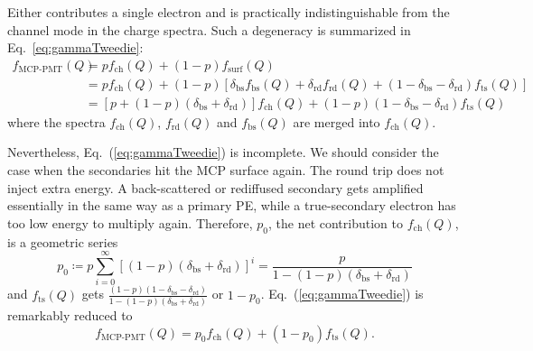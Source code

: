 Either contributes a single electron and is practically indistinguishable from
the channel mode in the charge spectra. Such a degeneracy is summarized in Eq.~\eqref{eq:gammaTweedie}:
\begin{equation}
	\label{eq:gammaTweedie}
	\begin{aligned}
		f_{\text{MCP-PMT}}(Q) & = p f_{\mathrm{ch}}(Q) + (1-p) f_{\mathrm{surf}}(Q)                                                                                                                                    \\
		                      & = p f_{\mathrm{ch}}(Q)+(1-p) [\delta_{\mathrm{bs}} f_{\mathrm{bs}}(Q) + \delta_{\mathrm{rd}} f_{\mathrm{rd}}(Q) + (1- \delta_{\mathrm{bs}} - \delta_{\mathrm{rd}}) f_{\mathrm{ts}}(Q)] \\
		                      & = [p + (1-p)(\delta_{\mathrm{bs}} + \delta_{\mathrm{rd}})] f_{\mathrm{ch}}(Q) + (1-p)(1-\delta_{\mathrm{bs}} - \delta_{\mathrm{rd}})f_{\mathrm{ts}}(Q)
	\end{aligned}
\end{equation}
where the spectra $f_{\mathrm{ch}}(Q)$, $f_{\mathrm{rd}}(Q)$ and $f_{\mathrm{bs}}(Q)$ are
merged into $f_{\mathrm{ch}}(Q)$.

Nevertheless, Eq.~(\ref{eq:gammaTweedie}) is incomplete.
We should consider the case when the secondaries hit the MCP surface again.
The round trip does not inject extra energy.
A back-scattered or rediffused secondary gets amplified essentially in the same way
as a primary PE, while a true-secondary electron has too low energy to multiply again.
Therefore, \(p_0\), the net contribution to \(f_{\mathrm{ch}}(Q)\), is a geometric series
\begin{equation}
	\label{eq:p0}
	p_0 \coloneqq p \sum_{{i}=0}^\infty [(1-p) (\delta_{\mathrm{bs}} + \delta_{\mathrm{rd}})]^{i} = \frac{p}{1 - (1-p) (\delta_{\mathrm{bs}} + \delta_{\mathrm{rd}})}
\end{equation}
and \(f_{\mathrm{ts}}(Q)\) gets \(\frac{(1-p)(1-\delta_{\mathrm{bs}} - \delta_{\mathrm{rd}})}{1 - (1-p) (\delta_{\mathrm{bs}} + \delta_{\mathrm{rd}})}\) or \(1-p_0\).
Eq.~(\ref{eq:gammaTweedie}) is remarkably reduced to
\begin{equation}
	\label{eq:1}
	f_{\text{MCP-PMT}}(Q) = p_0 f_{\mathrm{ch}}(Q) + (1-p_0) f_{\mathrm{ts}}(Q).
\end{equation}

